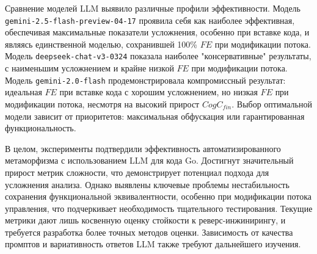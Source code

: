 Сравнение моделей LLM выявило различные профили эффективности. Модель \texttt{gemini-2.5-flash-preview-04-17} проявила себя как наиболее эффективная, обеспечивая максимальные показатели усложнения, особенно при вставке кода, и являясь единственной моделью, сохранившей 100\% $FE$ при модификации потока. Модель \texttt{deepseek-chat-v3-0324} показала наиболее "консервативные" результаты, с наименьшим усложнением и крайне низкой $FE$ при модификации потока. Модель \texttt{gemini-2.0-flash} продемонстрировала компромиссный результат: идеальная $FE$ при вставке кода с хорошим усложнением, но низкая $FE$ при модификации потока, несмотря на высокий прирост $CogC_{fin}$. Выбор оптимальной модели зависит от приоритетов: максимальная обфускация или гарантированная функциональность.

В целом, эксперименты подтвердили эффективность автоматизированного метаморфизма с использованием LLM для кода Go. Достигнут значительный прирост метрик сложности, что демонстрирует потенциал подхода для усложнения анализа. Однако выявлены ключевые проблемы нестабильность сохранения функциональной эквивалентности, особенно при модификации потока управления, что подчеркивает необходимость тщательного тестирования. Текущие метрики дают лишь косвенную оценку стойкости к реверс-инжинирингу, и требуется разработка более точных методов оценки. Зависимость от качества промптов и вариативность ответов LLM также требуют дальнейшего изучения.